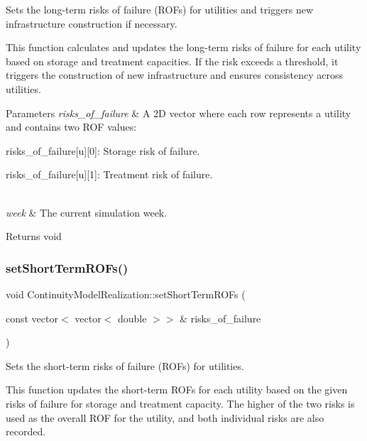 Sets the long-\/term risks of failure (R\+O\+Fs) for utilities and triggers new infrastructure construction if necessary. 

This function calculates and updates the long-\/term risks of failure for each utility based on storage and treatment capacities. If the risk exceeds a threshold, it triggers the construction of new infrastructure and ensures consistency across utilities.


\begin{DoxyParams}{Parameters}
{\em risks\+\_\+of\+\_\+failure} & A 2D vector where each row represents a utility and contains two R\+OF values\+:
\begin{DoxyItemize}
\item {\ttfamily risks\+\_\+of\+\_\+failure\mbox{[}u\mbox{]}\mbox{[}0\mbox{]}}\+: Storage risk of failure.
\item {\ttfamily risks\+\_\+of\+\_\+failure\mbox{[}u\mbox{]}\mbox{[}1\mbox{]}}\+: Treatment risk of failure. 
\end{DoxyItemize}\\
\hline
{\em week} & The current simulation week.\\
\hline
\end{DoxyParams}
\begin{DoxyReturn}{Returns}
void 
\end{DoxyReturn}
\mbox{\label{classContinuityModelRealization_ae2c40328beb671fa9b10ecc2921b8375}} 
\subsubsection{\texorpdfstring{set\+Short\+Term\+R\+O\+Fs()}{setShortTermROFs()}}
{\footnotesize\ttfamily void Continuity\+Model\+Realization\+::set\+Short\+Term\+R\+O\+Fs (\begin{DoxyParamCaption}\item[{const vector$<$ vector$<$ double $>$$>$ \&}]{risks\+\_\+of\+\_\+failure }\end{DoxyParamCaption})}



Sets the short-\/term risks of failure (R\+O\+Fs) for utilities. 

This function updates the short-\/term R\+O\+Fs for each utility based on the given risks of failure for storage and treatment capacity. The higher of the two risks is used as the overall R\+OF for the utility, and both individual risks are also recorded.


